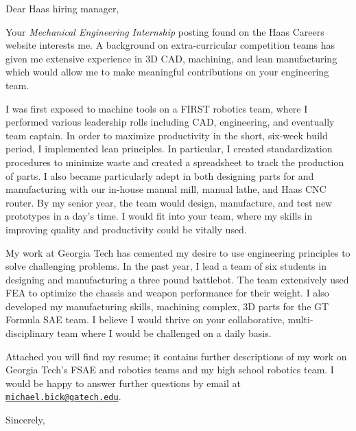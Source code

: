 \documentclass[12pt]{cover_letter}
\date{April 9, 2018}
\begin{document}
  \begin{letter}{}

    \opening{Dear Haas hiring manager,}

    \thispagestyle{fancy}

    Your \textit{Mechanical Engineering Internship} posting found on the Haas Careers website interests me. A background on extra-curricular competition teams has given me extensive experience in 3D CAD, machining, and lean manufacturing which would allow me to make meaningful contributions on your engineering team.

    I was first exposed to machine tools on a FIRST robotics team, where I performed various leadership rolls including CAD, engineering, and eventually team captain. In order to maximize productivity in the short, six-week build period, I implemented lean principles. In particular, I created standardization procedures to minimize waste and created a spreadsheet to track the production of parts. I also became particularly adept in both designing parts for and manufacturing with our in-house manual mill, manual lathe, and Haas CNC router. By my senior year, the team would design, manufacture, and test new prototypes in a day's time. I would fit into your team, where my skills in improving quality and productivity could be vitally used.

    My work at Georgia Tech has cemented my desire to use engineering principles to solve challenging problems. In the past year, I lead a team of six students in designing and manufacturing a three pound battlebot. The team extensively used FEA to optimize the chassis and weapon performance for their weight. I also developed my manufacturing skills, machining complex, 3D parts for the GT Formula SAE team. I believe I would thrive on your collaborative, multi-disciplinary team where I would be challenged on a daily basis.

    Attached you will find my resume; it contains further descriptions of my work on Georgia Tech's FSAE and robotics teams and my high school robotics team. I would be happy to answer further questions by email at \href{mailto:michael.bick@gatech.edu}{\nolinkurl{michael.bick@gatech.edu}}.

    \closing{Sincerely,}

  \end{letter}
\end{document}
